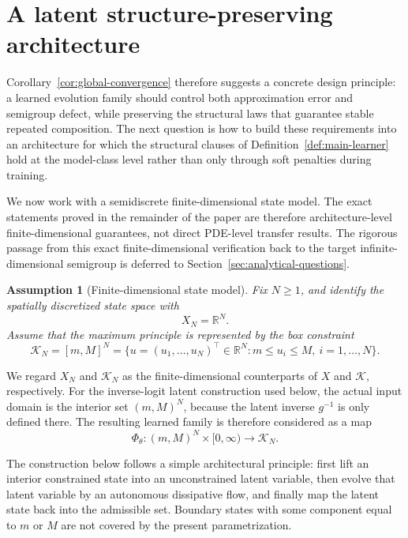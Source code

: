 \documentclass[11pt]{article}
\newtheorem{assumption}{Assumption}
\newcommand{\R}{\mathbb{R}}
\newcommand{\cK}{\mathcal{K}}
\newcommand{\PhiT}{\Phi_{\theta}}
\begin{document}
\section{A latent structure-preserving architecture}\label{sec:latent-architecture}
Corollary~\ref{cor:global-convergence} therefore suggests a concrete design principle: a learned evolution family should control both approximation error and semigroup defect, while preserving the structural laws that guarantee stable repeated composition. The next question is how to build these requirements into an architecture for which the structural clauses of Definition~\ref{def:main-learner} hold at the model-class level rather than only through soft penalties during training.

We now work with a semidiscrete finite-dimensional state model. The exact statements proved in the remainder of the paper are therefore architecture-level finite-dimensional guarantees, not direct PDE-level transfer results. The rigorous passage from this exact finite-dimensional verification back to the target infinite-dimensional semigroup is deferred to Section~\ref{sec:analytical-questions}.

\begin{assumption}[Finite-dimensional state model]\label{ass:finite-dim}
Fix \(N\ge 1\), and identify the spatially discretized state space with
\begin{equation}\label{eq:XN}
X_N=\R^N.
\end{equation}
Assume that the maximum principle is represented by the box constraint
\begin{equation}\label{eq:KN}
\cK_N=[m,M]^N=\{u=(u_1,\dots,u_N)^\top\in \R^N : m\le u_i\le M, \ i=1,\dots,N\}.
\end{equation}
\end{assumption}

We regard \(X_N\) and \(\cK_N\) as the finite-dimensional counterparts of \(X\) and \(\cK\), respectively. For the inverse-logit latent construction used below, the actual input domain is the interior set \((m,M)^N\), because the latent inverse \(g^{-1}\) is only defined there. The resulting learned family is therefore considered as a map
\begin{equation}\label{eq:finite-learner}
\PhiT : (m,M)^N\times [0,\infty)\to \cK_N.
\end{equation}

The construction below follows a simple architectural principle: first lift an interior constrained state into an unconstrained latent variable, then evolve that latent variable by an autonomous dissipative flow, and finally map the latent state back into the admissible set. Boundary states with some component equal to \(m\) or \(M\) are not covered by the present parametrization.
\end{document}
